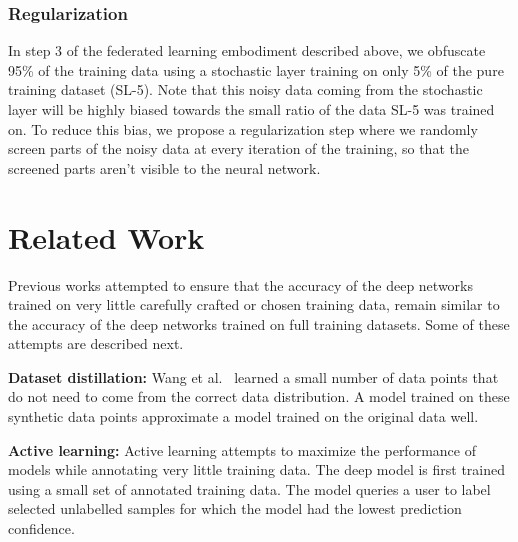 \documentclass[12pt, letterpaper]{article}
\begin{document}
\subsubsection{Regularization}
\label{sec:reg}
In step 3 of the federated learning embodiment described above, we obfuscate 95\% of the training data using a stochastic layer training on only 5\% of the pure training dataset (SL-5). Note that this noisy data coming from the stochastic layer will be highly biased towards the small ratio of the data SL-5 was trained on. To reduce this bias, we propose a regularization step where we randomly screen parts of the noisy data at every iteration of the training, so that the screened parts aren't visible to the neural network. 


\section{Related Work}
Previous works attempted to ensure that the accuracy of the deep networks trained on very little carefully crafted or chosen training data, remain similar to the accuracy of the deep networks trained on full training datasets. Some of these attempts are described next.

\noindent \textbf{Dataset distillation:} Wang et al.~\cite{datasetdistillation} learned a small number of data points that do not need to come from the correct data distribution.  A model trained on these synthetic data points approximate a model trained on the original data well.

\noindent \textbf{Active learning:} Active learning \cite{al1,al2,al3,al4} attempts to maximize the performance of models while annotating very little training data. The deep model is first trained using a small set of annotated training data.  The model queries a user to label selected unlabelled samples for which the model had the lowest prediction confidence. 


{\small


}
\end{document}
